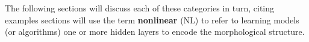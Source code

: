 The following sections will discuss each of these categories
in turn, citing examples 
sections will use the term
\textbf{nonlinear} (NL) to refer to learning
models (or algorithms) one
or more hidden layers to encode the
morphological structure.
%

%

